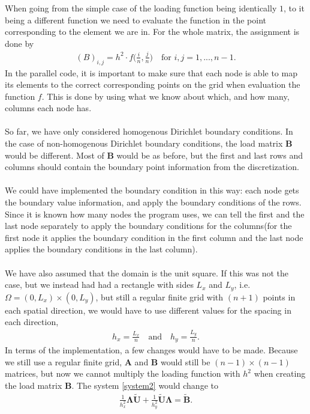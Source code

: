 When going from the simple case of the loading function being identically $1$, to it being a different function we need to evaluate the function in the point corresponding to the element we are in. For the whole matrix, the assignment is done by
\begin{align*}
	(B)_{i,j} = h^2\cdot f\Big(\frac{i}{n},\frac{j}{n}\Big) \quad \text{for } i,j = 1,...,n-1.
\end{align*}
In the parallel code, it is important to make sure that each node is able to map its elements to the correct corresponding points on the grid when evaluation the function $f$. This is done by using what we know about which, and how many, columns each node has.
\\
\\
So far, we have only considered homogenous Dirichlet boundary conditions. In the case of non-homogenous Dirichlet boundary conditions, the load matrix $\mathbf{B}$ would be different. Most of $\mathbf{B}$ would be as before, but the first and last rows and columns should contain the boundary point information from the discretization. \\
\\
We could have implemented the boundary condition in this way: each node gets the boundary value information, and apply the boundary conditions of the rows. Since it is known how many nodes the program uses, we can tell the first and the last node separately to apply the boundary conditions for the columns(for the first node it applies the boundary condition in the first column and the last node applies the boundary conditions in the last column).
\\
\\
We have also assumed that the domain is the unit square. If this was not the case, but we instead had had a rectangle with sides $L_x$ and $L_y$, i.e. $ \Omega = (0,L_x)\times (0,L_y)$, but still a regular finite grid with $(n+1)$ points in each spatial direction, we would have to use different values for the spacing in each direction, 
\begin{align*}
	h_x = \frac{L_x}{n} \quad \text{and} \quad h_y = \frac{L_y}{n}.
\end{align*}
In terms of the implementation, a few changes would have to be made. Because we still use a regular finite grid, $\mathbf{A}$ and $\mathbf{B}$ would still be $(n-1)\times (n-1)$ matrices, but now we cannot multiply the loading function with $h^2$ when creating the load matrix $\mathbf{B}$. The system \eqref{system2} would change to 
\begin{align*}
	\frac{1}{h_x^2}\mathbf{\Lambda\widetilde{U}} + \frac{1}{h_y^2}\mathbf{\widetilde{U}\Lambda} = \mathbf{\widetilde{B}}.
\end{align*}
